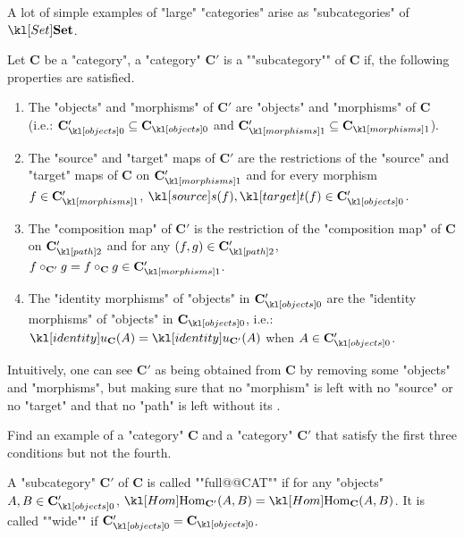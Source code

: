 \documentclass[main.tex]{subfiles}
\begin{document}
A lot of simple examples of "large" "categories" arise as "subcategories" of $\catSet$.
\begin{defn}[Subcategory]
	\AP Let $\mathbf{C}$ be a "category", a "category" $\mathbf{C}'$ is a ""subcategory"" of $\mathbf{C}$ if, the following properties are satisfied.
	\begin{enumerate}
		\item The "objects" and "morphisms" of $\mathbf{C}'$ are "objects" and "morphisms" of $\mathbf{C}$ (i.e.: $\obj{\mathbf{C}'} \subseteq \obj{\mathbf{C}}$ and $\mor{\mathbf{C}'} \subseteq \mor{\mathbf{C}}$).
		\item The "source" and "target" maps of $\mathbf{C}'$ are the restrictions of the "source" and "target" maps of $\mathbf{C}$ on $\mor{\mathbf{C}'}$ and for every morphism $f \in \mor{\mathbf{C}'}$, $\source(f), \target(f) \in \obj{\mathbf{C}'}$.
		\item The "composition map" of $\mathbf{C}'$ is the restriction of the "composition map" of $\mathbf{C}$ on $\mortwo{\mathbf{C}'}$ and for any $(f,g) \in \mortwo{\mathbf{C}'}$, $f\circ_{\mathbf{C}'} g = f \circ_{\mathbf{C}} g \in \mor{\mathbf{C}'}$.
		\item The "identity morphisms" of "objects" in $\obj{\mathbf{C}'}$ are the "identity morphisms" of "objects" in $\obj{\mathbf{C}}$, i.e.: $\idu_{\mathbf{C}}(A) = \idu_{\mathbf{C}'}(A)$ when $A \in \obj{\mathbf{C}'}$.
	\end{enumerate}
	Intuitively, one can see $\mathbf{C}'$ as being obtained from $\mathbf{C}$ by removing some "objects" and "morphisms", but making sure that no "morphism" is left with no "source" or no "target" and that no "path" is left without its .
\end{defn}
\begin{exer}[\NOW]\label{exer:catfunc:countersubcat}
	Find an example of a "category" $\mathbf{C}$ and a "category" $\mathbf{C}'$ that satisfy the first three conditions but not the fourth.
\end{exer}
\begin{defn}
	\AP A "subcategory" $\mathbf{C}'$ of $\mathbf{C}$ is called ""full@@CAT"" if for any "objects" $A,B \in \obj{\mathbf{C}'}$, $\Hom_{\mathbf{C}'}(A,B) = \Hom_{\mathbf{C}}(A,B)$. \AP It is called ""wide"" if $\obj{\mathbf{C}'} = \obj{\mathbf{C}}$.
\end{defn}
\end{document}
